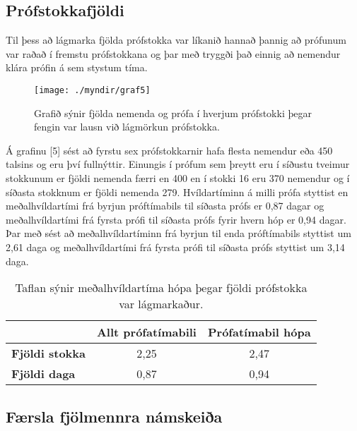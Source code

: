 \documentclass[12pt]{article}
\begin{document}
\subsection{Prófstokkafjöldi}

Til þess að lágmarka fjölda prófstokka var líkanið hannað þannig að prófunum var raðað í fremstu prófstokkana og þar með tryggði það einnig að nemendur klára prófin á sem stystum tíma. 

\newpage

\begin{figure}[h]
    \centering
    \texttt{[image: ./myndir/graf5]}
    \caption{Grafið sýnir fjölda nemenda og prófa í hverjum prófstokki þegar fengin var lausn við lágmörkun prófstokka.}
\end{figure}

Á grafinu [5] sést að fyrstu sex prófstokkarnir hafa flesta nemendur eða 450 talsins og eru því fullnýttir. Einungis í prófum sem þreytt eru í síðustu tveimur stokkunum er fjöldi nemenda færri en 400 en í stokki 16 eru 370 nemendur og í síðasta stokknum er fjöldi nemenda 279.
Hvíldartíminn á milli prófa styttist en meðalhvíldartími frá byrjun próftímabils til síðasta prófs er 0,87 dagar og meðalhvíldartími frá fyrsta prófi til síðasta prófs fyrir hvern hóp er 0,94 dagar. Þar með sést að meðalhvíldartíminn frá byrjun til enda próftímabils styttist um 2,61 daga og meðalhvíldartími frá fyrsta prófi til síðasta prófs styttist um 3,14 daga. 


\begin{table}[h]
    \centering
    \begin{tabular}{l|c|c|}
        \cline{2-3}
        & \multicolumn{1}{l|}{\textbf{Allt prófatímabili}} & \multicolumn{1}{l|}{\textbf{Prófatímabil hópa}} \\ \hline
        \multicolumn{1}{|l|}{\textbf{Fjöldi stokka}} & 2,25                                             & 2,47                                            \\ \hline
        \multicolumn{1}{|l|}{\textbf{Fjöldi daga}}   & 0,87                                             & 0,94                                            \\ \hline
    \end{tabular}
    \caption{Taflan sýnir meðalhvíldartíma hópa þegar fjöldi  prófstokka var lágmarkaður.}
\end{table}

\subsection{Færsla fjölmennra námskeiða}
\end{document}
